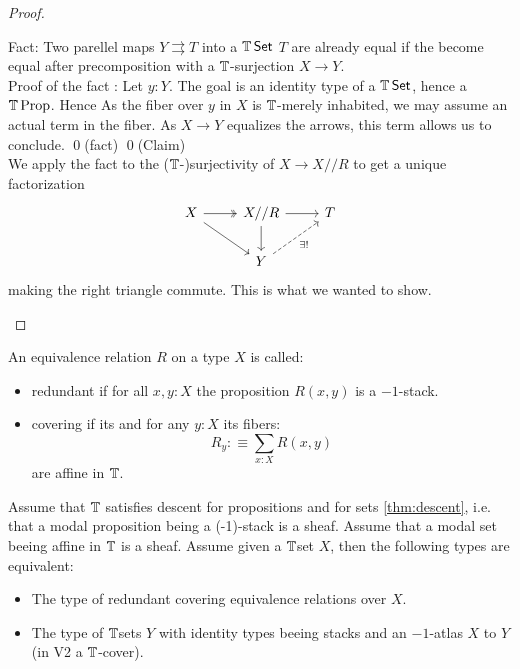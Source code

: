 \begin{proof}
\begin{itemize}
		Fact: Two parellel maps $Y \rightrightarrows T$ into a $\mathbb{T} \operatorname{\mathsf {Set}}$ $T$ are already equal if the become equal after precomposition with a $\mathbb{T}$-surjection $X \to Y$.  \\
		Proof of the fact : Let $y : Y$. The goal is an identity type of a $\mathbb{T} \operatorname{\mathsf {Set}}$, hence a $\mathbb{T} \operatorname{Prop}$. Hence As the fiber over $y$ in $X$ is $\mathbb{T}$-merely inhabited, we may assume an actual term in the fiber. 	As $X \to Y$ equalizes the arrows, this term allows us to conclude. \qed (fact)	\qed(Claim) \\
		We apply the fact to the ($\mathbb{T}$-)surjectivity of $X \to X // R $ to get a unique factorization 
		\[\begin{tikzcd}
			X & {X // R} & T \\
			& Y
			\arrow[two heads, from=1-1, to=1-2]
			\arrow[from=1-1, to=2-2]
			\arrow[from=1-2, to=1-3]
			\arrow[from=1-2, to=2-2]
			\arrow["{\exists!}"', dashed, from=2-2, to=1-3]
		\end{tikzcd}\]
		making the right triangle commute. This is what we wanted to show.
	\end{itemize}
\end{proof}

\begin{definition}
	An equivalence relation $R$ on a type $X$ is called:
	\begin{itemize}
		\item redundant if for all $x,y:X$ the proposition $R(x,y)$ is a  $-1$-stack.
		\item covering if its  and for any $y:X$ its fibers:
		\[R_y :\equiv \sum_{x:X} R(x,y)\]
		are affine in $\mathbb{T}$.
	\end{itemize}
\end{definition}

\begin{lemma}\label{fundamental-propriety-algebraic-spaces}
	Assume that $\mathbb{T}$ satisfies descent for propositions and for sets \ref{thm:descent}, i.e. that a modal proposition being a  (-1)-stack is a sheaf. Assume that a modal set beeing affine in $\mathbb{T}$ is a sheaf.
	Assume given a $\mathbb{T}$set $X$, then the following types are equivalent:
	\begin{itemize}
		\item The type of redundant covering equivalence relations over $X$.
		\item The type of $\mathbb{T}$sets $Y$ with identity types beeing  stacks and an $-1$-atlas $X$ to $Y$ (in V2 a $\mathbb{T}$-cover).
	\end{itemize}
\end{lemma}

